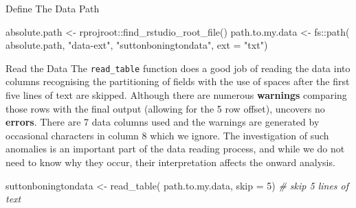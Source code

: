 \documentclass[
  ignorenonframetext,
]{beamer}
\newenvironment{Shaded}{\begin{snugshade}}{\end{snugshade}}
\newcommand{\AttributeTok}[1]{\textcolor[rgb]{0.77,0.63,0.00}{#1}}
\newcommand{\CommentTok}[1]{\textcolor[rgb]{0.56,0.35,0.01}{\textit{#1}}}
\newcommand{\DecValTok}[1]{\textcolor[rgb]{0.00,0.00,0.81}{#1}}
\newcommand{\FunctionTok}[1]{\textcolor[rgb]{0.00,0.00,0.00}{#1}}
\newcommand{\NormalTok}[1]{#1}
\newcommand{\OtherTok}[1]{\textcolor[rgb]{0.56,0.35,0.01}{#1}}
\newcommand{\SpecialCharTok}[1]{\textcolor[rgb]{0.00,0.00,0.00}{#1}}
\newcommand{\StringTok}[1]{\textcolor[rgb]{0.31,0.60,0.02}{#1}}
\begin{document}
\begin{frame}[fragile]{Define The Data Path}
\protect\hypertarget{define-the-data-path}{}
\begin{Shaded}
\begin{Highlighting}[]
\NormalTok{absolute.path }\OtherTok{\textless{}{-}}\NormalTok{ rprojroot}\SpecialCharTok{::}\FunctionTok{find\_rstudio\_root\_file}\NormalTok{()}
\NormalTok{path.to.my.data }\OtherTok{\textless{}{-}}\NormalTok{ fs}\SpecialCharTok{::}\FunctionTok{path}\NormalTok{( absolute.path,}
                             \StringTok{"data{-}ext"}\NormalTok{,}
                             \StringTok{"suttonboningtondata"}\NormalTok{, }
                            \AttributeTok{ext =} \StringTok{"txt"}\NormalTok{)}
\end{Highlighting}
\end{Shaded}
\end{frame}

\begin{frame}[fragile]{Read the Data}
\protect\hypertarget{read-the-data}{}
The \texttt{read\_table} function does a good job of reading the data
into columns recognising the partitioning of fields with the use of
spaces after the first five lines of text are skipped. Although there
are numerous \textbf{warnings} comparing those rows with the final
output (allowing for the 5 row offset), uncovers no \textbf{errors}.
There are 7 data columns used and the warnings are generated by
occasional characters in column 8 which we ignore. The investigation of
such anomalies is an important part of the data reading process, and
while we do not need to know why they occur, their interpretation
affects the onward analysis.

\begin{Shaded}
\begin{Highlighting}[]
\NormalTok{suttonboningtondata }\OtherTok{\textless{}{-}} \FunctionTok{read\_table}\NormalTok{(}
\NormalTok{  path.to.my.data,}
  \AttributeTok{skip =} \DecValTok{5}\NormalTok{) }\CommentTok{\# skip 5 lines of text}
\end{Highlighting}
\end{Shaded}
\end{frame}
\end{document}
